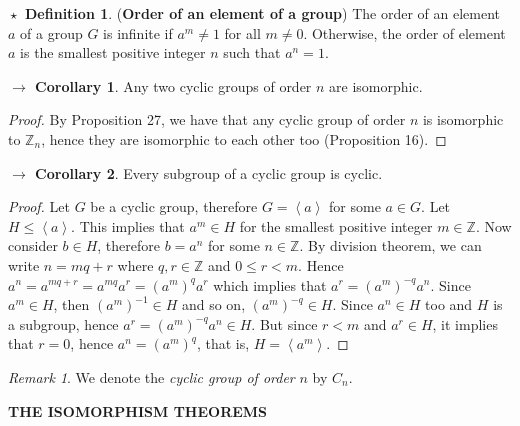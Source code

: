 \documentclass{article}
\theoremstyle{definition}
\newtheorem{definition}{$\boxed{\star}$ Definition}
\theoremstyle{remark}
\newtheorem*{remark}{Remark}
\theoremstyle{definition}
\newtheorem{corollary}{$ \to $ Corollary}
\theoremstyle{definition}
\theoremstyle{definition}
\theoremstyle{proof}
\newcommand{\inv}[1]{#1^{-1}}
\newcommand{\gen}[1]{\left\langle #1\right\rangle}
\begin{document}
\hrulefill
\begin{definition}
	(\textbf{Order of an element of a group}) The order of an element $ a $ of a group $ G $ is infinite if $ a^m \neq 1 $ for all $ m\neq 0 $. Otherwise, the order of element $ a $ is the smallest positive integer $ n $ such that $ a^n = 1 $.
\end{definition}
\begin{corollary}
	Any two cyclic groups of order $ n $ are isomorphic.
\end{corollary}
\begin{proof}
	By Proposition 27, we have that any cyclic group of order $ n $ is isomorphic to $ \mathbb{Z}_n $, hence they are isomorphic to each other too (Proposition 16).
\end{proof}
\begin{corollary}
	Every subgroup of a cyclic group is cyclic.
\end{corollary}
\begin{proof}
	Let $ G $ be a cyclic group, therefore $ G = \gen{a} $ for some $ a\in G $. Let $ H\le \gen{a} $. This implies that $ a^m \in H $ for the smallest positive integer $ m\in \mathbb{Z} $. Now consider $ b\in H $, therefore $ b = a^n $ for some $ n\in \mathbb{Z} $. By division theorem, we can write $ n = mq + r $ where $ q,r \in \mathbb{Z} $ and $  0\le r < m$. Hence $ a^n = a^{mq+r} = a^{mq}a^r = (a^m)^q a^r$ which implies that $ a^r = (a^m)^{-q} a^n $. Since $ a^m \in H $, then $ \inv{(a^m)}\in H $ and so on, $ (a^m)^{-q} \in H$. Since $ a^n \in H $ too and $ H $ is a subgroup, hence $ a^r = (a^m)^{-q} a^n \in H$. But since $ r<m $ and $ a^r \in H $, it implies that $ r=0 $, hence $ a^n = (a^m)^q $, that is, $ H = \gen{a^m} $.
\end{proof}
\begin{remark}
	We denote the \emph{cyclic group of order} $ n $ by $ C_n $.
\end{remark}
\hrulefill
\textbf{THE ISOMORPHISM THEOREMS}
\hrulefill
\end{document}
